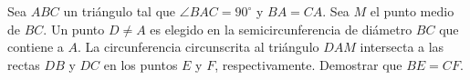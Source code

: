 Sea $ABC$ un triángulo tal que $\angle BAC = 90^{\circ}$ y $BA = CA$. Sea $M$ el punto medio de $BC$. Un punto $D \neq A$ es elegido en la semicircunferencia de diámetro $BC$ que contiene a $A$. La circunferencia circunscrita al triángulo $DAM$ intersecta a las rectas $DB$ y $DC$ en los puntos $E$ y $F$, respectivamente. Demostrar que $BE = CF$.
